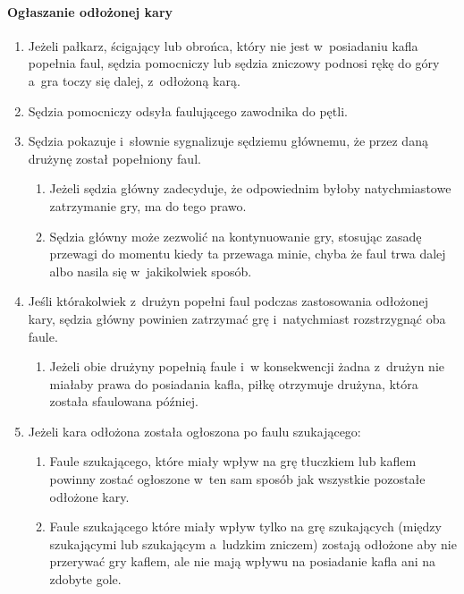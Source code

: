 \documentclass[12pt,a4paper]{article}
\begin{document}
\paragraph{Ogłaszanie odłożonej kary}

\begin{enumerate}
	\item
	      Jeżeli pałkarz, ścigający lub obrońca, który nie jest w~posiadaniu
	      kafla popełnia faul, sędzia pomocniczy lub sędzia zniczowy podnosi
	      rękę do góry a~gra toczy się dalej, z~odłożoną karą.
	\item
	      Sędzia pomocniczy odsyła faulującego zawodnika do pętli.
	\item
	      Sędzia pokazuje i~słownie sygnalizuje sędziemu głównemu, że przez
	      daną drużynę został popełniony faul.

	      \begin{enumerate}
		      \item
		            Jeżeli sędzia główny zadecyduje, że odpowiednim byłoby
		            natychmiastowe zatrzymanie gry, ma do tego prawo.
		      \item
		            Sędzia główny może zezwolić na kontynuowanie gry, stosując zasadę
		            przewagi do momentu kiedy ta przewaga minie, chyba że faul trwa
		            dalej albo nasila się w~jakikolwiek sposób.
	      \end{enumerate}
	\item
	      Jeśli którakolwiek z~drużyn popełni faul podczas zastosowania odłożonej kary, sędzia główny powinien zatrzymać grę i~natychmiast
	      rozstrzygnąć oba faule.

	      \begin{enumerate}
		      \item
		            Jeżeli obie drużyny popełnią faule i~w konsekwencji żadna z~drużyn
		            nie miałaby prawa do posiadania kafla, piłkę otrzymuje drużyna,
		            która została sfaulowana później.
	      \end{enumerate}
	\item
	      Jeżeli kara odłożona została ogłoszona po faulu szukającego:

	      \begin{enumerate}
		      \item
		            Faule szukającego, które miały wpływ na grę tłuczkiem lub kaflem
		            powinny zostać ogłoszone w~ten sam sposób jak wszystkie pozostałe
		            odłożone kary.
		      \item
		            Faule szukającego które miały wpływ tylko na grę szukających (między
		            szukającymi lub szukającym a~ludzkim zniczem) zostają odłożone aby
		            nie przerywać gry kaflem, ale nie mają wpływu na posiadanie kafla
		            ani na zdobyte gole.
	      \end{enumerate}
\end{enumerate}
\end{document}
